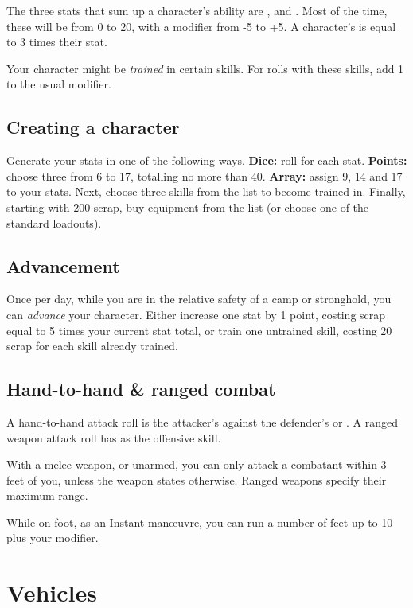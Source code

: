 \documentclass[10pt, a4paper, twocolumn]{article}
\begin{document}
The three stats that sum up a character's ability are ,  and . Most of the time, these will be from 0 to 20, with a modifier from -5 to +5. A character's  is equal to 3 times their  stat.

Your character might be \emph{trained} in certain skills. For rolls with these skills, add 1 to the usual modifier.

\subsection{Creating a character}
Generate your stats in one of the following ways. \textbf{Dice:} roll  for each stat. \textbf{Points:} choose three from 6 to 17, totalling no more than 40. \textbf{Array:} assign 9, 14 and 17 to your stats. Next, choose three skills from the list to become trained in. Finally, starting with 200 scrap, buy equipment from the list (or choose one of the standard loadouts).

\subsection{Advancement}
Once per day, while you are in the relative safety of a camp or stronghold, you can \emph{advance} your character. Either increase one stat by 1 point, costing scrap equal to 5 times your current stat total, or train one untrained skill, costing 20 scrap for each skill already trained.

\subsection{Hand-to-hand \& ranged combat}
A hand-to-hand attack roll is the attacker's  against the defender's  or . A ranged weapon attack roll has  as the offensive skill.

With a melee weapon, or unarmed, you can only attack a combatant within 3 feet of you, unless the weapon states otherwise. Ranged weapons specify their maximum range.

While on foot, as an Instant man\oe{}uvre, you can run a number of feet up to 10 plus your  modifier.

\section{Vehicles}
\end{document}
